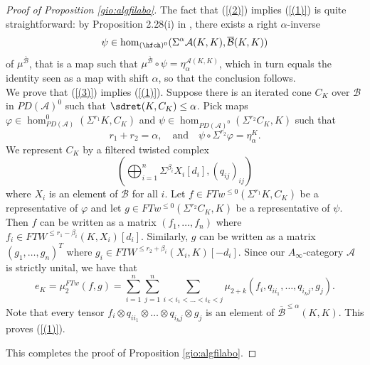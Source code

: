 \begin{proof}[Proof of Proposition \ref{gio:algfilabo}]
		
		The fact that (\ref{(2)}) implies (\ref{(1)}) is quite straightforward: by Proposition 2.28(i) in \cite{BCZ:tpc}, there exists a right $\alpha$-inverse $$\psi\in \hom_{(\hfch)^0}(\Sigma^\alpha \mathcal{A}(K,K),\overline{\mathcal{B}}(K,K))$$ of $\mu^{\overline{\mathcal{B}}}$, that is a map such that $\mu^{\overline{\mathcal{B}}}\circ \psi = \eta^{\mathcal{A}(K,K)}_\alpha$, which in turn equals the identity seen as a map with shift $\alpha$, so that the conclusion follows.\\
		
		
		We prove that (\ref{(3)}) implies (\ref{(1)}). Suppose there is an iterated cone $C_K$ over $\mathcal{B}$ in $PD(\mathcal{A})^0$ such that $\sdret(K,C_K)\leq \alpha$. Pick maps $\varphi\in \hom_{PD(\mathcal{A})}^0(\Sigma^{r_1}K, C_K)$ and $\psi\in \hom_{PD(\mathcal{A})^0}(\Sigma^{r_2}C_K,K)$ such that $$r_1+r_2=\alpha, \quad \text{and} \quad \psi\circ\Sigma^{r_2}\varphi = \eta^K_{\alpha}.$$
		We represent $C_K$ by a filtered twisted complex $$\left(\bigoplus_{i=1}^n \Sigma^{\beta_i}X_i[d_i], (q_{ij})_{ij}\right)$$ where $X_i$ is an element of $\mathcal{B}$ for all $i$. Let $f\in FTw^{\leq0}(\Sigma^{r_1}K, C_K)$ be a representative of $\varphi$ and let $g\in FTw^{\leq0}(\Sigma^{r_2}C_K, K)$ be a representative of $\psi$. Then $f$ can be written as a matrix $(f_1,\ldots, f_n)$ where $f_i\in FTW^{\leq r_1-\beta_i}(K,X_i)[d_i]$. Similarly, $g$ can be written as a matrix $(g_1,\ldots, g_n)^T$ where $g_i\in FTW^{\leq r_2+\beta_i}(X_i,K)[-d_i]$. Since our $A_\infty$-category $\mathcal{A}$ is strictly unital, we have that $$e_K=\mu_2^{FTw}(f,g) = \sum_{i=1}^n\sum_{j=1}^n\sum_{i<i_1<\ldots<i_k<j}\mu_{2+k}(f_i, q_{ii_1},\ldots,q_{i_{k}j}, g_j).$$ Note that every tensor $f_i\otimes q_{ii_1}\otimes \ldots\otimes q_{i_{k}j}\otimes g_j$ is an element of $\overline{\mathcal{B}}^{\leq \alpha}(K,K)$. This proves (\ref{(1)}).
		
		This completes the proof of Proposition \ref{gio:algfilabo}.		
	\end{proof}

